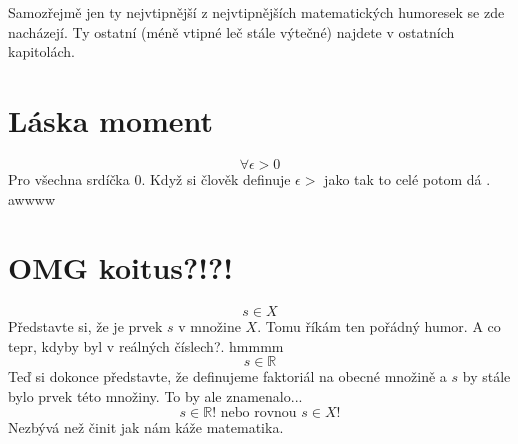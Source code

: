 Samozřejmě jen ty nejvtipnější z nejvtipnějších matematických humoresek se zde
nacházejí. Ty ostatní (méně vtipné leč stále výtečné) najdete v ostatních
kapitolách.



\section{Láska moment}
\label{sec:laska-moment}
\[
 \forall \epsilon > 0
\]
Pro všechna srdíčka 0. Když si člověk definuje $\epsilon >$ jako  tak
to celé potom dá . awwww


\section{OMG koitus?!?!}
\label{sec:omg-koitus}
\[
 s \in X
\]
Představte si, že je prvek $s$ v množine $X$. Tomu říkám ten pořádný humor. A co
tepr, kdyby byl v reálných číslech?. hmmmm
\[
 s \in \mathbb{R}
\]
Teď si dokonce představte, že definujeme faktoriál na obecné množině a $s$ by
stále bylo prvek této množiny. To by ale znamenalo...
\[
 s \in \mathbb{R}! \text{~nebo rovnou~} s \in X!
\]
Nezbývá než činit jak nám káže matematika.
